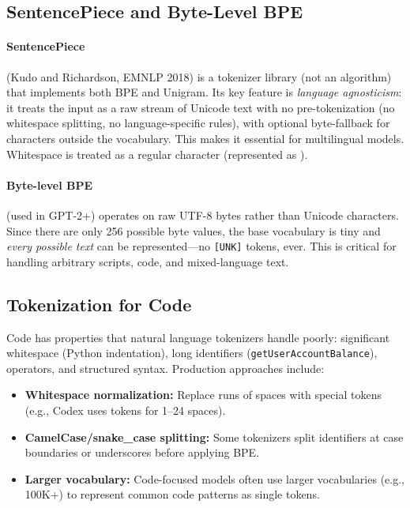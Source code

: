 \subsection{SentencePiece and Byte-Level BPE}

\paragraph{SentencePiece} (Kudo and Richardson, EMNLP 2018) is a tokenizer library
(not an algorithm) that implements both BPE and Unigram.  Its key feature is
\emph{language agnosticism}: it treats the input as a raw stream of Unicode text with no
pre-tokenization (no whitespace splitting, no language-specific rules), with optional
byte-fallback for characters outside the vocabulary.  This makes it
essential for multilingual models.  Whitespace is treated as a regular character
(represented as \texttt{\textunderscore}).

\paragraph{Byte-level BPE} (used in GPT-2+) operates on raw UTF-8 bytes rather than
Unicode characters.  Since there are only 256 possible byte values, the base vocabulary
is tiny and \emph{every possible text} can be represented---no \texttt{[UNK]} tokens,
ever.  This is critical for handling arbitrary scripts, code, and mixed-language text.

\subsection{Tokenization for Code}

Code has properties that natural language tokenizers handle poorly: significant whitespace
(Python indentation), long identifiers (\texttt{getUserAccountBalance}), operators, and
structured syntax.  Production approaches include:
\begin{itemize}
    \item \textbf{Whitespace normalization:} Replace runs of spaces with special tokens
          (e.g., Codex uses tokens for 1--24 spaces).
    \item \textbf{CamelCase/snake\_case splitting:} Some tokenizers split identifiers
          at case boundaries or underscores before applying BPE.
    \item \textbf{Larger vocabulary:} Code-focused models often use larger vocabularies
          (e.g., 100K+) to represent common code patterns as single tokens.
\end{itemize}

